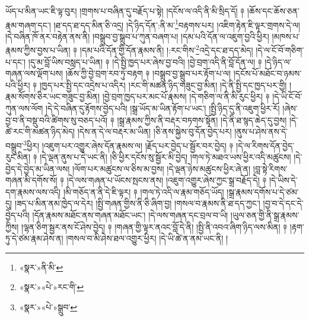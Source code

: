 ཡོད་པ་མིན་ཡང་ཇི་ལྟ་བུར། །གྲགས་པ་བཞིན་དུ་བརྗོད་པ་སྟེ། །དངོས་ལ་འདི་ནི་མི་སྲིད་དོ། ༈ །ཆོས་དང་ཆོས་ཅན་རྣམ་གཞག་དང་། །ཐ་དད་ཐ་དད་མིན་ཅི་འདྲ། །དེ་ཉིད་དོན་:ནི་མ་\footnote{«སྣར་»ནི་མི་}བརྟགས་པར། །འཇིག་རྟེན་ཇི་ལྟར་གྲགས་དེ་ལ། །དེ་བཞིན་ཁོ་ནར་བརྟེན་ནས་ནི། །བསྒྲུབ་བྱ་སྒྲུབ་པ་ཀུན་བཞག་པ། །དམ་པའི་དོན་ལ་འཇུག་བྱའི་ཕྱིར། །མཁས་པ་རྣམས་ཀྱིས་བྱས་པ་ཡིན། ༈ །དམ་པའི་དོན་གྱི་དོན་རྣམས་ནི། །:རང་གིས་\footnote{«སྣར་»«པེ་»རང་གི་}འདྲེ་དང་ཐ་དད་མེད། །དེ་ལ་ངོ་བོ་གཅིག་པ་དང་། །དུ་མ་བློ་ཡིས་བསླད་པ་ཡིན། ༈ །དེ་སྤྱི་ཁྱད་པར་ཞེས་བྱ་བའི། །བྱེ་བྲག་འདི་ནི་བློ་དོན་ལ། ༈ །དེ་ཉིད་ལ་གཞན་ལས་ལྡོག་པས། །ཆོས་ཀྱི་བྱེ་བྲག་རབ་ཏུ་བརྟག ༈ །བསྒྲུབ་བྱ་སྒྲུབ་པར་རྟོག་པ་ལ། །དངོས་པོ་མཐོང་བ་ཉམས་པའི་ཕྱིར། ༈ །ཁྱད་པར་སྤྱི་དང་འདྲེས་པ་འདིར། །རང་གི་མཚན་ཉིད་གཟུང་བྱ་མིན། །དེ་ནི་སྤྱི་དང་ཁྱད་པར་གྱི། །རྣམ་སོགས་ཅིར་ཡང་གཟུང་བྱ་མིན། །བྱེ་བྲག་ཁྱད་པར་མང་པོ་རྣམས། །དེ་གཅིག་ལ་ནི་མི་རུང་ཕྱིར། ༈ །དེ་ཡི་ངོ་བོ་ཀུན་ལས་ལོག །དེ་དེ་བཞིན་དུ་རྟོགས་བྱེད་པའི། །སྒྲ་ཡོད་མ་ཡིན་རྟོག་པ་ཡང་། །སྤྱི་ཉིད་དུ་ནི་འཇུག་ཕྱིར་རོ། །ཞེས་བྱ་བ་ནི་བསྡུ་བའི་ཚིགས་སུ་བཅད་པའོ། ༈ །སྒྲ་རྣམས་ཀྱིས་ནི་བརྡར་བཏགས་སྟོན། །དེ་ནི་ཐ་སྙད་ཆེད་དུ་བྱས། །དེ་ཚེ་རང་གི་མཚན་ཉིད་མེད། །དེས་ན་དེ་ལ་བརྡར་མ་ཡིན། །ཅི་ནས་སྐྱེས་བུ་དོན་བྱེད་པར། །ནུས་པ་ཤེས་ནས་དེ་བསྒྲུབ་\footnote{«སྣར་»«པེ་»སྒྲུབ་}ཕྱིར། །འཇུག་པར་འགྱུར་ཞེས་དོན་རྣམས་ལ། །རྗོད་པར་བྱེད་པ་སྦྱོར་བར་བྱེད། ༈ །དེ་ལ་རིགས་དོན་བྱེད་རུང་མིན། ༈ །དེ་ལྡན་ནུས་པ་དེ་ཡང་ནི། །ཅི་ཕྱིར་དངོས་སུ་སྦྱོར་མི་བྱེད། །གལ་ཏེ་མཐའ་ཡས་ཕྱིར་འདི་མཚུངས། །དེ་བྱེད་དེ་བྱེད་མ་ཡིན་ལས། །ལོག་པར་མཚུངས་ལ་ཅིས་མ་བྱས། །དེ་ལྡན་ཉེས་མཚུངས་ཕྱིར་ཞེ་ན། །བླ་སྟེ་རིགས་གཞན་མི་དགོས་སོ། ༈ །དེ་ལས་གཞན་པ་ཡོངས་སྤངས་ནས། །འཇུག་འགྱུར་ཞེས་ཀྱང་སྒྲ་བརྗོད་དེ། ༈ །དེ་ཡིས་དེ་དག་རྣམས་ལས་འདི། །མི་གཅོད་ན་ནི་དེ་ཇི་ལྟར། ༈ །གལ་ཏེ་འདི་ལ་རྣམ་གཅོད་ཡོད། །སྒྲ་རྣམས་དགོས་པ་དེ་ཙམ་དུ། །ཟད་པ་མིན་ནམ་ཁྱེད་ལ་དེར། །སྤྱི་གཞན་གྱིས་ནི་ཅི་ཞིག་བྱ། །གསལ་བ་རྣམས་ནི་ཐ་དད་ཀྱང་། །བྱ་བ་དེ་དང་དེ་བྱེད་པའི། །དོན་རྣམས་མཐོང་ནས་གཞན་མཐོང་ཡང་། །དེ་ལས་གཞན་དང་བྲལ་བ་ཡི། །ཡུལ་ཅན་གྱི་ནི་སྒྲ་རྣམས་ཀྱིས། །ལྷན་ཅིག་སྦྱར་ནས་ངོ་ཤེས་བྱེད། ༈ །གཞན་གྱི་ལྟར་ནའང་བློ་དེ་ནི། །སྤྱི་ནི་འབའ་ཞིག་ཉིད་ལས་མིན། ༈ །རྟག་ཏུ་དེ་ཙམ་རྣམ་ཤེས་ན། །གསལ་བ་མི་ཤེས་ཐལ་འགྱུར་ཕྱིར། །དེ་ཡི་ཚེ་ན་ནམ་ཡང་ནི། །
